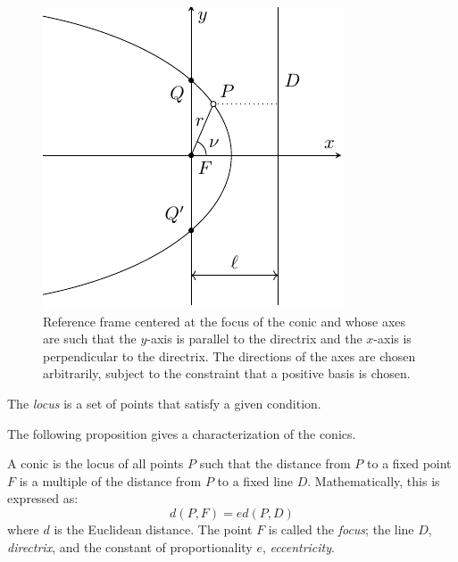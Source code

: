 \documentclass[../main.tex]{subfiles}
\begin{document}
\begin{figure}[htbp]
\begin{minipage}[t]{0.45\textwidth}
    \includegraphics[width=\textwidth]{Images/conics.pdf}
    \caption{Reference frame centered at the focus of the conic and whose axes are such that the $y$-axis is parallel to the directrix and the $x$-axis is perpendicular to the directrix. The directions of the axes are chosen arbitrarily, subject to the constraint that a positive basis is chosen.}
    \label{fig:conics_cartesian}
  \end{minipage}
\end{figure}
\begin{definition}
  The \emph{locus} is a set of points that satisfy a given condition.
\end{definition}
The following proposition gives a characterization of the conics.
\begin{proposition}
  A conic is the locus of all points $P$ such that the distance from $P$ to a fixed point $F$ is a multiple of the distance from $P$ to a fixed line $D$. Mathematically, this is expressed as:
  \begin{equation}\label{eq:conic_pre}
    d(P,F)=e d(P,D)
  \end{equation}
  where $d$ is the Euclidean distance. The point $F$ is called the \emph{focus}; the line $D$, \emph{directrix}, and the constant of proportionality $e$, \emph{eccentricity}.
\end{proposition}
\end{document}
